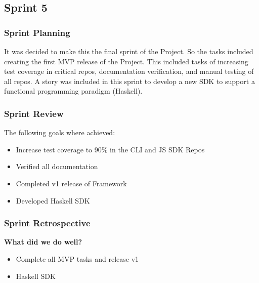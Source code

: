 \subsection{Sprint 5}
\subsubsection{Sprint Planning}
It was decided to make this the final sprint of the Project. So the tasks included creating the first MVP release of the Project. This included tasks of increasing test coverage in critical repos, documentation verification, and manual testing of all repos. A story was included in this sprint to develop a new SDK to support a functional programming paradigm (Haskell).
\subsubsection{Sprint Review}
The following goals where achieved:
\begin{itemize}
    \item Increase test coverage to 90\% in the CLI and JS SDK Repos
    \item Verified all documentation
    \item Completed v1 release of Framework
    \item Developed Haskell SDK
\end{itemize}
\subsubsection{Sprint Retrospective}
\textbf{What did we do well?}
\begin{itemize}
    \item Complete all MVP tasks and release v1
    \item Haskell SDK 
\end{itemize}
